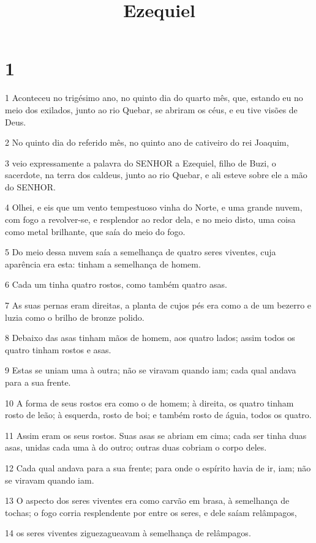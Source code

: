 

\title{Ezequiel}


\chapter{1}

\par 1 Aconteceu no trigésimo ano, no quinto dia do quarto mês, que, estando eu no meio dos exilados, junto ao rio Quebar, se abriram os céus, e eu tive visões de Deus.
\par 2 No quinto dia do referido mês, no quinto ano de cativeiro do rei Joaquim,
\par 3 veio expressamente a palavra do SENHOR a Ezequiel, filho de Buzi, o sacerdote, na terra dos caldeus, junto ao rio Quebar, e ali esteve sobre ele a mão do SENHOR.
\par 4 Olhei, e eis que um vento tempestuoso vinha do Norte, e uma grande nuvem, com fogo a revolver-se, e resplendor ao redor dela, e no meio disto, uma coisa como metal brilhante, que saía do meio do fogo.
\par 5 Do meio dessa nuvem saía a semelhança de quatro seres viventes, cuja aparência era esta: tinham a semelhança de homem.
\par 6 Cada um tinha quatro rostos, como também quatro asas.
\par 7 As suas pernas eram direitas, a planta de cujos pés era como a de um bezerro e luzia como o brilho de bronze polido.
\par 8 Debaixo das asas tinham mãos de homem, aos quatro lados; assim todos os quatro tinham rostos e asas.
\par 9 Estas se uniam uma à outra; não se viravam quando iam; cada qual andava para a sua frente.
\par 10 A forma de seus rostos era como o de homem; à direita, os quatro tinham rosto de leão; à esquerda, rosto de boi; e também rosto de águia, todos os quatro.
\par 11 Assim eram os seus rostos. Suas asas se abriam em cima; cada ser tinha duas asas, unidas cada uma à do outro; outras duas cobriam o corpo deles.
\par 12 Cada qual andava para a sua frente; para onde o espírito havia de ir, iam; não se viravam quando iam.
\par 13 O aspecto dos seres viventes era como carvão em brasa, à semelhança de tochas; o fogo corria resplendente por entre os seres, e dele saíam relâmpagos,
\par 14 os seres viventes ziguezagueavam à semelhança de relâmpagos.

